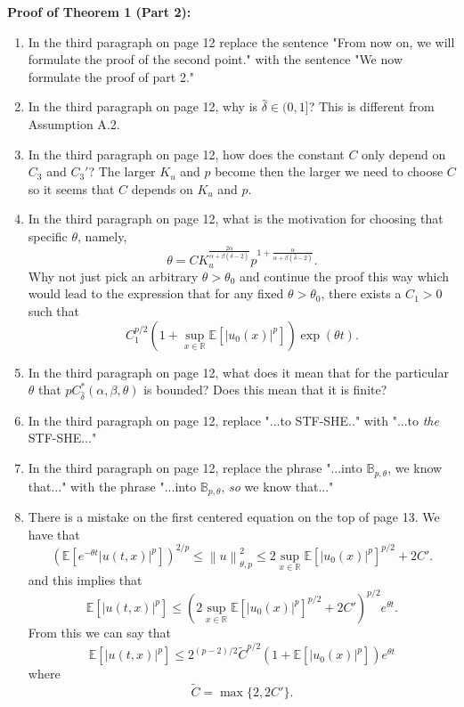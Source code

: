 \documentclass[a4paper,11pt]{article}
\numberwithin{equation}{section}
\numberwithin{equation}{section}
\theoremstyle{plain}
\theoremstyle{definition}
\newcommand{\Norm}[1]{\left\|  #1   \right\|}
\newcommand{\R}{\mathbb{R}}
\begin{document}
\textbf{Proof of Theorem 1 (Part 2):}
\begin{enumerate}
	\item 
In the third paragraph on page 12 replace the sentence "From now on, we will formulate the proof of the second point." with the sentence "We now formulate the proof of part 2." 

	\item 
In the third paragraph on page 12, why is $\hat{\delta} \in (0,1]$? This is different from Assumption A.2.

	\item 
In the third paragraph on page 12, how does the constant $C$ only depend on $C_3$ and $C_3'$? The larger $K_u$ and $p$ become then the larger we need to choose $C$ so it seems that $C$ depends on $K_u$ and $p$. 

	\item 
In the third paragraph on page 12, what is the motivation for choosing that specific $\theta$, namely, 
	\[
		\theta = C K_u^{\frac{2\alpha}{\alpha + \beta(\hat{\delta}-2)}} p^{1+\frac{\alpha}{\alpha + \beta(\hat{\delta}-2)}}.
	\]
Why not just pick an arbitrary $\theta > \theta_0$ and continue the proof this way which would lead to the expression that for any fixed $\theta>\theta_0$, there exists a $C_1>0$ such that
	\[
		C_1^{p/2}\left( 1 + \sup_{x\in \R} \mathbb{E}\left[|u_0(x)|^p\right] \right) \exp(\theta t).
	\]
	
	\item
In the third paragraph on page 12, what does it mean that for the particular $\theta$ that $pC_{\hat{\delta}}^*(\alpha, \beta, \theta)$ is bounded? Does this mean that it is finite? 

	\item
In the third paragraph on page 12, replace "...to STF-SHE.." with "...to \textit{the} STF-SHE..."
	
	\item 
In the third paragraph on page 12, replace the phrase "...into $\mathbb{B}_{p,\theta}$, we know that..." with the phrase "...into $\mathbb{B}_{p,\theta}$, \textit{so} we know that..."

	\item 
There is a mistake on the first centered equation on the top of page 13. We have that 	
	\[
		\left( \mathbb{E}\left[ e^{-\theta t} |u(t,x)|^p \right] \right)^{2/p} \le \Norm{u}_{\theta,p}^2 \le 2\sup_{x \in \R} \mathbb{E}\left[ |u_0(x)|^p \right]^{p/2} + 2C'.
	\]
and this implies that
	\[
			\mathbb{E}\left[ |u(t,x)|^p \right]  \le \left(2\sup_{x \in \R} \mathbb{E}\left[ |u_0(x)|^p \right]^{p/2} + 2C'\right)^{p/2}e^{\theta t }.
	\]
From this we can say that 
	\[
			\mathbb{E}\left[ |u(t,x)|^p \right]  \le 2^{(p-2)/2}\tilde{C}^{p/2} \left(1 + \mathbb{E}\left[ |u_0(x)|^p \right]\right) e^{\theta t}
	\]
where 
	\[
		\tilde{C} = \max\{ 2, 2C' \}.
	\]
\end{enumerate}
\end{document}
